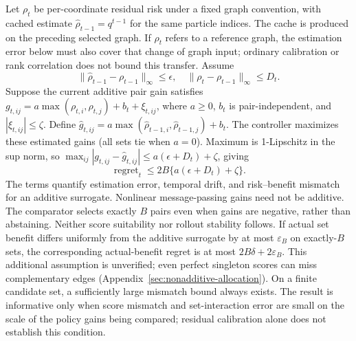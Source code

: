 Let $\rho_t$ be per-coordinate residual risk under a fixed graph convention, with cached estimate $\widehat\rho_{t-1}=q^{t-1}$ for the same particle indices. The cache is produced on the preceding selected graph. If $\rho_t$ refers to a reference graph, the estimation error below must also cover that change of graph input; ordinary calibration or rank correlation does not bound this transfer. Assume
\begin{equation}
 \|\widehat\rho_{t-1}-\rho_{t-1}\|_\infty\le\epsilon,
 \quad \|\rho_t-\rho_{t-1}\|_\infty\le D_t.
\end{equation}
Suppose the current additive pair gain satisfies
$g_{t,ij}=a\max(\rho_{t,i},\rho_{t,j})+b_t+\xi_{t,ij}$,
where $a\ge0$, $b_t$ is pair-independent, and $|\xi_{t,ij}|\le\zeta$. Define $\widehat g_{t,ij}=a\max(\widehat\rho_{t-1,i},\widehat\rho_{t-1,j})+b_t$. The controller maximizes these estimated gains (all sets tie when $a=0$). Maximum is 1-Lipschitz in the sup norm, so $\max_{ij}|g_{t,ij}-\widehat g_{t,ij}|\le a(\epsilon+D_t)+\zeta$, giving
\begin{equation}
 \operatorname{regret}_t\le 2B\{a(\epsilon+D_t)+\zeta\}.
\end{equation}
The terms quantify estimation error, temporal drift, and risk--benefit mismatch for an additive surrogate. Nonlinear message-passing gains need not be additive. The comparator selects exactly $B$ pairs even when gains are negative, rather than abstaining. Neither score suitability nor rollout stability follows.
If actual set benefit differs uniformly from the additive surrogate by at most $\varepsilon_B$ on exactly-$B$ sets, the corresponding actual-benefit regret is at most $2B\delta+2\varepsilon_B$. This additional assumption is unverified; even perfect singleton scores can miss complementary edges (Appendix~\ref{sec:nonadditive-allocation}).
On a finite candidate set, a sufficiently large mismatch bound always exists. The result is informative only when score mismatch and set-interaction error are small on the scale of the policy gains being compared; residual calibration alone does not establish this condition.

